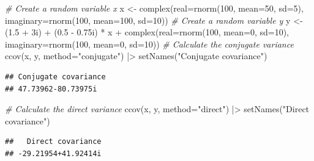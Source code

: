 \documentclass[
]{book}
\newenvironment{Shaded}{\begin{snugshade}}{\end{snugshade}}
\newcommand{\AttributeTok}[1]{\textcolor[rgb]{0.77,0.63,0.00}{#1}}
\newcommand{\CommentTok}[1]{\textcolor[rgb]{0.56,0.35,0.01}{\textit{#1}}}
\newcommand{\DecValTok}[1]{\textcolor[rgb]{0.00,0.00,0.81}{#1}}
\newcommand{\FloatTok}[1]{\textcolor[rgb]{0.00,0.00,0.81}{#1}}
\newcommand{\FunctionTok}[1]{\textcolor[rgb]{0.00,0.00,0.00}{#1}}
\newcommand{\NormalTok}[1]{#1}
\newcommand{\OtherTok}[1]{\textcolor[rgb]{0.56,0.35,0.01}{#1}}
\newcommand{\SpecialCharTok}[1]{\textcolor[rgb]{0.00,0.00,0.00}{#1}}
\newcommand{\StringTok}[1]{\textcolor[rgb]{0.31,0.60,0.02}{#1}}
\begin{document}
\begin{Shaded}
\begin{Highlighting}[]
\CommentTok{\# Create a random variable x}
\NormalTok{x }\OtherTok{\textless{}{-}} \FunctionTok{complex}\NormalTok{(}\AttributeTok{real=}\FunctionTok{rnorm}\NormalTok{(}\DecValTok{100}\NormalTok{, }\AttributeTok{mean=}\DecValTok{50}\NormalTok{, }\AttributeTok{sd=}\DecValTok{5}\NormalTok{),}
             \AttributeTok{imaginary=}\FunctionTok{rnorm}\NormalTok{(}\DecValTok{100}\NormalTok{, }\AttributeTok{mean=}\DecValTok{100}\NormalTok{, }\AttributeTok{sd=}\DecValTok{10}\NormalTok{))}
\CommentTok{\# Create a random variable y}
\NormalTok{y }\OtherTok{\textless{}{-}}\NormalTok{ (}\FloatTok{1.5} \SpecialCharTok{+}\NormalTok{ 3i) }\SpecialCharTok{+}\NormalTok{ (}\FloatTok{0.5} \SpecialCharTok{{-}} \FloatTok{0.75}\NormalTok{i) }\SpecialCharTok{*}\NormalTok{ x }\SpecialCharTok{+}
            \FunctionTok{complex}\NormalTok{(}\AttributeTok{real=}\FunctionTok{rnorm}\NormalTok{(}\DecValTok{100}\NormalTok{, }\AttributeTok{mean=}\DecValTok{0}\NormalTok{, }\AttributeTok{sd=}\DecValTok{10}\NormalTok{),}
                    \AttributeTok{imaginary=}\FunctionTok{rnorm}\NormalTok{(}\DecValTok{100}\NormalTok{, }\AttributeTok{mean=}\DecValTok{0}\NormalTok{, }\AttributeTok{sd=}\DecValTok{10}\NormalTok{))}
\CommentTok{\# Calculate the conjugate variance}
\FunctionTok{ccov}\NormalTok{(x, y, }\AttributeTok{method=}\StringTok{"conjugate"}\NormalTok{) }\SpecialCharTok{|\textgreater{}}
    \FunctionTok{setNames}\NormalTok{(}\StringTok{"Conjugate covariance"}\NormalTok{)}
\end{Highlighting}
\end{Shaded}

\begin{verbatim}
## Conjugate covariance 
## 47.73962-80.73975i
\end{verbatim}

\begin{Shaded}
\begin{Highlighting}[]
\CommentTok{\# Calculate the direct variance}
\FunctionTok{ccov}\NormalTok{(x, y, }\AttributeTok{method=}\StringTok{"direct"}\NormalTok{) }\SpecialCharTok{|\textgreater{}}
    \FunctionTok{setNames}\NormalTok{(}\StringTok{"Direct covariance"}\NormalTok{)}
\end{Highlighting}
\end{Shaded}

\begin{verbatim}
##   Direct covariance 
## -29.21954+41.92414i
\end{verbatim}
\end{document}
